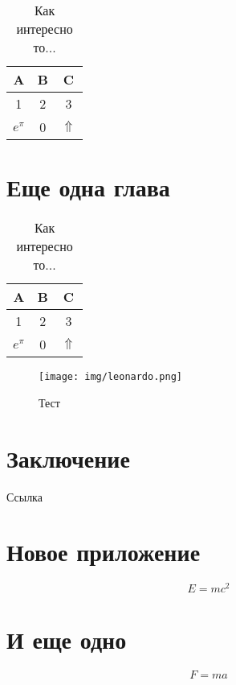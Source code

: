 \documentclass[12pt, rusmathsym]{nirreport}
\begin{document}
\lipsum[1]

\begin{table}[ht]
  \caption{Как интересно то...}
  \centering
  \begin{tabular}{ccc} \hline
    A           & B & C            \\ \hline
    1           & 2 & 3            \\
    \(e^{\pi}\) & 0 & \(\Uparrow\) \\ \hline
  \end{tabular}
\end{table}

\chapter{Еще одна глава}

\lipsum[1]

\begin{table}[!ht]
  \caption{Как интересно то...}
  \centering
  \begin{tabular}{ccc} \hline
    A           & B & C            \\ \hline
    1           & 2 & 3            \\
    \(e^{\pi}\) & 0 & \(\Uparrow\) \\ \hline
  \end{tabular}
\end{table}

\lipsum[1]

\begin{figure}[!ht]
  \begin{center}
    \texttt{[image: img/leonardo.png]}
  \end{center}
  \caption{Тест}
\end{figure}

\chapter*{Заключение}

Ссылка~\cite{Pup09}

\lipsum[1]

% 
% 
\printbibliography

\appendix

\chapter{Новое приложение}

\[ E = m c^2 \]

\chapter{И еще одно}

\[ F = m a \]
\end{document}
